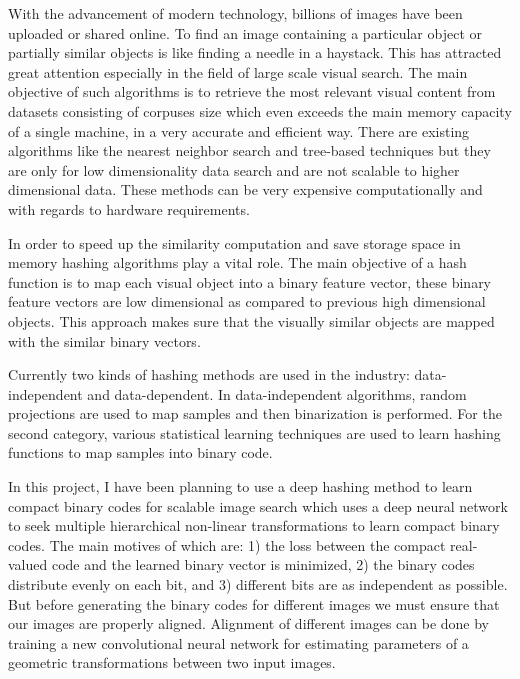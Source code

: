 \documentclass[12pt, a4paper,twoside]{article}
\begin{document}
\label{sec:introduction}
With the advancement of modern technology, billions of images have been uploaded or shared online. To find an image containing a particular object or partially 
similar objects is like finding a needle in a haystack. This has attracted great attention especially in the field of large scale visual search. The main objective of such algorithms is to retrieve the most relevant visual content from 
datasets consisting of corpuses size which even exceeds the main memory capacity of a single machine, in a very accurate and efficient way.
There are existing algorithms like the nearest neighbor search and tree-based techniques but they are only for low dimensionality data search and are 
not scalable to higher dimensional data. These methods can be very expensive computationally and with regards to hardware requirements.

In order to speed up the similarity computation and save storage space in memory hashing algorithms play a vital role. The main objective of a 
hash function is to map each visual object into a binary feature vector, these binary feature vectors are low dimensional as compared to previous 
high dimensional objects. This approach makes sure that the visually similar objects are mapped with the similar binary vectors.

Currently two kinds of hashing methods are used in the industry: data-independent and data-dependent. In data-independent algorithms, random 
projections are used to map samples and then binarization is performed. For the second category, various statistical learning techniques are used to learn hashing functions to map samples into binary code.

In this project, I have been planning to use a deep hashing method \cite{DeepHashing} to learn compact binary codes for scalable image search which uses a deep neural network to seek multiple hierarchical non-linear transformations to learn compact binary codes. The main motives of which are:
1) the loss between the compact real-valued code and the learned binary vector is minimized, 2) the binary codes distribute evenly on
each bit, and 3) different bits are as independent as possible. But before generating the binary codes for different images we must ensure that 
our images are properly aligned.
Alignment of different images can be done by training a new convolutional neural network for estimating parameters of a geometric transformations 
between two input images.
\end{document}
